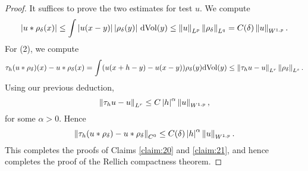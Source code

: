 \begin{proof}
  It suffices to prove the two estimates for test $u$. We compute
  \begin{equation*}
    \left|u\ast \rho_{\delta}(x)\right|\le \int \left|u(x-y)\right|\left|\rho_{\delta}(y)\right|\,\mathrm{d}\mathrm{Vol}(y)\le \left\lVert u\right\rVert_{L^{p}}\left\lVert\rho_{\delta}\right\rVert_{L^{q}}=C(\delta)\left\lVert u\right\rVert_{W^{1,p}}.
  \end{equation*}
  For (2), we compute
  \begin{equation*}
    \tau_{h}(u\ast \rho_{\delta})(x)-u\ast\rho_{\delta}(x)=\int (u(x+h-y)-u(x-y))\rho_{\delta}(y)\mathrm{d}\mathrm{Vol}(y)\le \left\lVert\tau_{h}u-u\right\rVert_{L^{r}}\left\lVert\rho_{\delta}\right\rVert_{L^{s}}.
  \end{equation*}
  Using our previous deduction,
  \begin{equation*}
    \left\lVert\tau_{h}u-u\right\rVert_{L^{r}}\le C\left|h\right|^{\alpha}\left\lVert u\right\rVert_{W^{1,p}},
  \end{equation*}
  for some $\alpha>0$. Hence
  \begin{equation*}
    \left\lVert\tau_{h}(u\ast \rho_{\delta})-u\ast\rho_{\delta}\right\rVert_{C^{0}}\le C(\delta) \left|h\right|^{\alpha}\left\lVert u\right\rVert_{W^{1,p}}.
  \end{equation*}
  This completes the proofs of Claims \ref{claim:20} and \ref{claim:21}, and hence completes the proof of the Rellich compactness theorem.
\end{proof}

